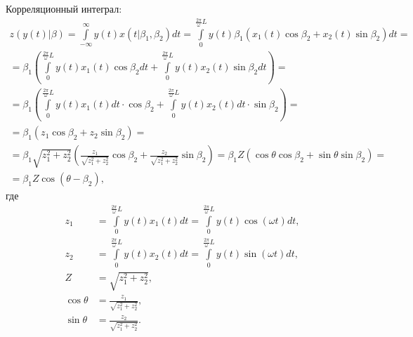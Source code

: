 \documentclass[a4paper,12pt]{article}
\begin{document}
    Корреляционный интеграл:
    \begin{multline*}
        z(y(t) | \beta)
        = \int \limits_{-\infty}^{\infty} y(t) x(t | \beta_1, \beta_2) dt
        = \int \limits_0^{\frac{2 \pi}{\omega} L} y(t) \beta_1 \left ( x_1(t) \cos \beta_2 + x_2(t) \sin \beta_2 \right ) dt = \\
        = \beta_1 \left ( \int \limits_0^{\frac{2 \pi}{\omega} L} y(t) x_1(t) \cos \beta_2 dt + \int \limits_0^{\frac{2 \pi}{\omega} L} y(t) x_2(t) \sin \beta_2 dt \right ) = \\
        = \beta_1 \left ( \int \limits_0^{\frac{2 \pi}{\omega} L} y(t) x_1(t) dt \cdot \cos \beta_2 + \int \limits_0^{\frac{2 \pi}{\omega} L} y(t) x_2(t) dt \cdot \sin \beta_2 \right ) = \\
        = \beta_1 \left ( z_1 \cos \beta_2 + z_2 \sin \beta_2 \right ) = \\
        = \beta_1 \sqrt{z_1^2 + z_2^2} \left ( \frac{z_1}{\sqrt{z_1^2 + z_2^2}} \cos \beta_2 + \frac{z_2}{\sqrt{z_1^2 + z_2^2}} \sin \beta_2 \right )
        = \beta_1 Z \left ( \cos \theta \cos \beta_2 + \sin \theta \sin \beta_2 \right ) = \\
        = \beta_1 Z \cos ( \theta - \beta_2 ) ,
    \end{multline*}
    где
    \begin{align*}
        z_1         & = \int \limits_0^{\frac{2 \pi}{\omega} L} y(t) x_1(t) dt = \int \limits_0^{\frac{2 \pi}{\omega} L} y(t) \cos ( \omega t) dt , \\
        z_2         & = \int \limits_0^{\frac{2 \pi}{\omega} L} y(t) x_2(t) dt = \int \limits_0^{\frac{2 \pi}{\omega} L} y(t) \sin ( \omega t) dt , \\
        Z           & = \sqrt{z_1^2 + z_2^2} , \\
        \cos \theta & = \frac{z_1}{\sqrt{z_1^2 + z_2^2}} , \\
        \sin \theta & = \frac{z_2}{\sqrt{z_1^2 + z_2^2}} .
    \end{align*}
\end{document}
